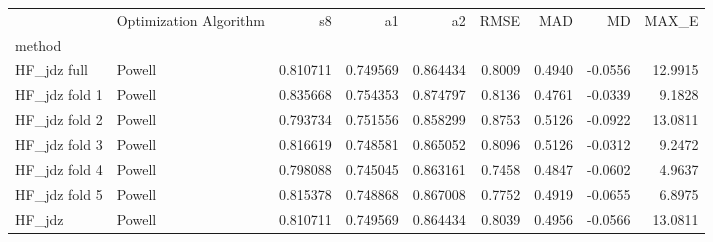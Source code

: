 \begin{tabular}{llrrrrrrr}
 & Optimization Algorithm & s8 & a1 & a2 & RMSE & MAD & MD & MAX_E \\
method &  &  &  &  &  &  &  &  \\
HF_jdz full & Powell & 0.810711 & 0.749569 & 0.864434 & 0.8009 & 0.4940 & -0.0556 & 12.9915 \\
HF_jdz fold 1 & Powell & 0.835668 & 0.754353 & 0.874797 & 0.8136 & 0.4761 & -0.0339 & 9.1828 \\
HF_jdz fold 2 & Powell & 0.793734 & 0.751556 & 0.858299 & 0.8753 & 0.5126 & -0.0922 & 13.0811 \\
HF_jdz fold 3 & Powell & 0.816619 & 0.748581 & 0.865052 & 0.8096 & 0.5126 & -0.0312 & 9.2472 \\
HF_jdz fold 4 & Powell & 0.798088 & 0.745045 & 0.863161 & 0.7458 & 0.4847 & -0.0602 & 4.9637 \\
HF_jdz fold 5 & Powell & 0.815378 & 0.748868 & 0.867008 & 0.7752 & 0.4919 & -0.0655 & 6.8975 \\
HF_jdz & Powell & 0.810711 & 0.749569 & 0.864434 & 0.8039 & 0.4956 & -0.0566 & 13.0811 \\
\end{tabular}
